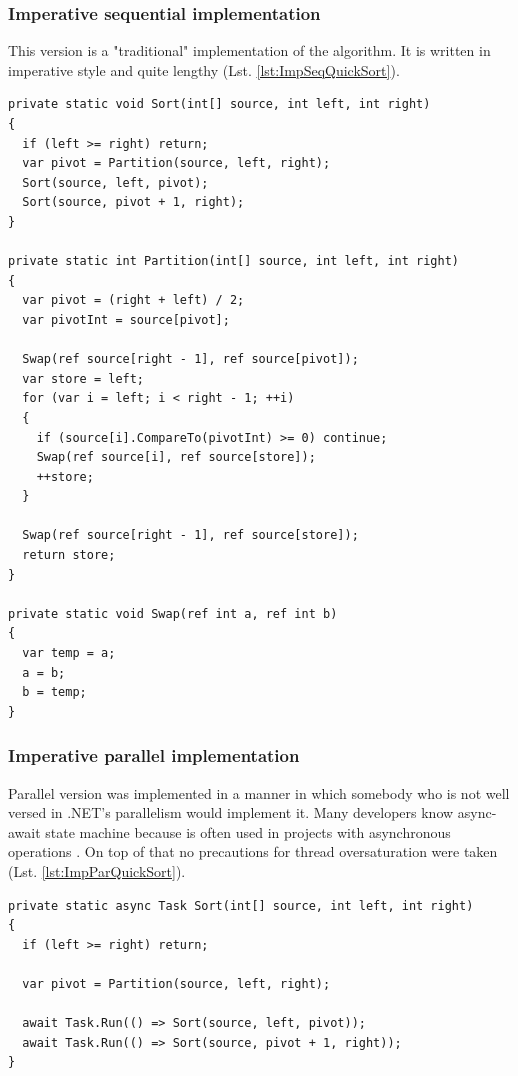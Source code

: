 \subsubsection{Imperative sequential implementation}
This version is a "traditional" implementation of the algorithm. It is written in imperative style and quite lengthy (Lst. \ref{lst:ImpSeqQuickSort}).
\begin{lstlisting}[language={[sharp]c}, style=sharpcstyle, caption={Imperative sequential quicksort implementation}, label={lst:ImpSeqQuickSort}]
private static void Sort(int[] source, int left, int right)
{
  if (left >= right) return;
  var pivot = Partition(source, left, right);
  Sort(source, left, pivot);
  Sort(source, pivot + 1, right);
}

private static int Partition(int[] source, int left, int right)
{
  var pivot = (right + left) / 2;
  var pivotInt = source[pivot];

  Swap(ref source[right - 1], ref source[pivot]);
  var store = left;
  for (var i = left; i < right - 1; ++i)
  {
    if (source[i].CompareTo(pivotInt) >= 0) continue;
    Swap(ref source[i], ref source[store]);
    ++store;
  }

  Swap(ref source[right - 1], ref source[store]);
  return store;
}

private static void Swap(ref int a, ref int b)
{
  var temp = a;
  a = b;
  b = temp;
}
\end{lstlisting}

\subsubsection{Imperative parallel implementation}
Parallel version was implemented in a manner in which somebody who is not well versed in .NET's parallelism would implement it. Many developers know async-await state machine because is often used in projects with asynchronous operations . On top of that no precautions for thread oversaturation were taken (Lst. \ref{lst:ImpParQuickSort}).
\begin{lstlisting}[language={[sharp]c}, style=sharpcstyle, caption={Imperative parallel quicksort}, label={lst:ImpParQuickSort}]
private static async Task Sort(int[] source, int left, int right)
{
  if (left >= right) return;

  var pivot = Partition(source, left, right);

  await Task.Run(() => Sort(source, left, pivot));
  await Task.Run(() => Sort(source, pivot + 1, right));
}
\end{lstlisting}


